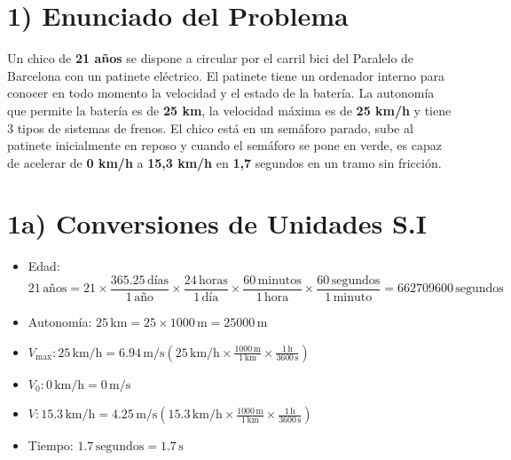 \documentclass{article}
\begin{document}
\section*{1) Enunciado del Problema}

Un chico de \textbf{21 años}  se dispone a circular por el carril bici del Paralelo de Barcelona con un patinete eléctrico. El patinete tiene un ordenador interno para conocer en todo momento la velocidad y el estado de la batería. La autonomía que permite la batería es de \textbf{25 km}, la velocidad máxima es de \textbf{25 km/h} y tiene 3 tipos de sistemas de frenos. El chico está en un semáforo parado, sube al patinete inicialmente en reposo y cuando el semáforo se pone en verde, es capaz de acelerar de \textbf{0 km/h} a \textbf{15,3 km/h} en \textbf{1,7} segundos en un tramo sin fricción.


\section*{1a) Conversiones de Unidades S.I}

\begin{itemize}
    \item Edad: \[
21 \, \text{años} = 21 \times \frac{365.25 \, \text{días}}{1 \, \text{año}} \times \frac{24 \, \text{horas}}{1 \, \text{día}} \times \frac{60 \, \text{minutos}}{1 \, \text{hora}} \times \frac{60 \, \text{segundos}}{1 \, \text{minuto}} = 662709600\, \text{segundos}
\]
    \item Autonomía: \(25 \, \text{km} = 25 \times 1000 \, \text{m} = 25000 \, \text{m}\)
    \item \(V_{\text{max}}: 25 \, \text{km/h} = 6.94 \, \text{m/s} \left( 25 \, \text{km/h} \times \frac{1000 \, \text{m}}{1 \, \text{km}} \times \frac{1 \, \text{h}}{3600 \, \text{s}} \right)\)
    \item \(V_0: 0 \, \text{km/h} = 0 \, \text{m/s}\)
    \item \(V: 15.3 \, \text{km/h} = 4.25 \, \text{m/s} \left( 15.3 \, \text{km/h} \times \frac{1000 \, \text{m}}{1 \, \text{km}} \times \frac{1 \, \text{h}}{3600 \, \text{s}} \right)\)
    \item Tiempo: \(1.7 \, \text{segundos} = 1.7 \, \text{s}\)
\end{itemize}

\end{document}

